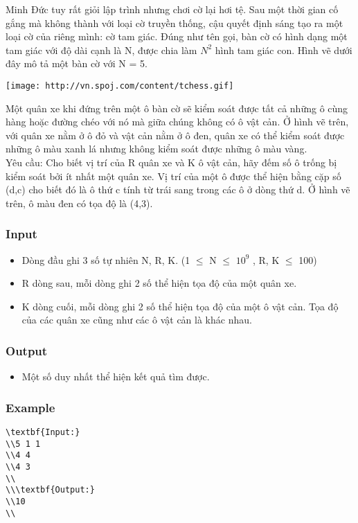 



   Minh Đức tuy rất giỏi lập trình nhưng chơi cờ lại hơi tệ. Sau một thời gian cố gắng mà không thành với loại cờ truyền thống, cậu quyết định sáng tạo ra một loại cờ của riêng mình: cờ tam giác. Đúng như tên gọi, bàn cờ có hình dạng một tam giác với độ dài cạnh là N, được chia làm $N^{2}$   hình tam giác con. Hình vẽ dưới đây mô tả một bàn cờ với N = 5.  


\texttt{[image: http://vn.spoj.com/content/tchess.gif]}

   Một quân xe khi đứng trên một ô bàn cờ sẽ kiểm soát được tất cả những ô cùng hàng hoặc đường chéo với nó mà giữa chúng không có ô vật cản. Ở hình vẽ trên, với quân xe nằm ở ô đỏ và vật cản nằm ở ô đen, quân xe có thể kiểm soát được những ô màu xanh lá nhưng không kiểm soát được những ô màu vàng.   
\\   Yêu cầu: Cho biết vị trí của R quân xe và K ô vật cản, hãy đếm số ô trống bị kiểm soát bởi ít nhất một quân xe. Vị trí của một ô được thể hiện bằng cặp số (d,c) cho biết đó là ô thứ c tính từ trái sang trong các ô ở dòng thứ d. Ở hình vẽ trên, ô màu đen có tọa độ là (4,3).  

\subsubsection{   Input  }
\begin{itemize}
	\item     Dòng đầu ghi 3 số tự nhiên N, R, K. (1  $\le$  N  $\le$  $10^{9}$    , R, K  $\le$  100)   
	\item     R dòng sau, mỗi dòng ghi 2 số thể hiện tọa độ của một quân xe.   
	\item     K dòng cuối, mỗi dòng ghi 2 số thể hiện tọa độ của một ô vật cản. Tọa độ của các quân xe cũng như các ô vật cản là khác nhau.   
\end{itemize}

\subsubsection{   Output  }
\begin{itemize}
	\item     Một số duy nhất thể hiện kết quả tìm được.   
\end{itemize}

\subsubsection{   Example  }
\begin{verbatim}
\textbf{Input:}
\\5 1 1
\\4 4
\\4 3
\\
\\\textbf{Output:}
\\10
\\\end{verbatim}
